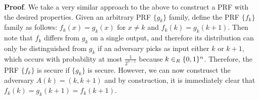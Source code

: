 \documentclass{article}
\begin{document}
\begin{enumerate}
\begin{mdbmarginx}{1ex}{0pt}{1ex}{0pt}%
\noindent{}\textbf{Proof}.    We take a very similar approach to the above to construct a PRF with the desired properties.
  Given an arbitrary PRF $\{g_k \}$ family, define the PRF $\{f_k \}$ family as follows: $f_k(x) = g_k(x)$
  for $x \neq k$ and $f_k(k) = g_k(k+1)$. Then note that $f_k$ differs from $g_k$ on a single 
  output, and therefore its distribution can only be distinguished from $g_k$ if an adversary
  picks as input either $k$ or $k+1$, which occurs with probability at most $\frac{1}{2^{n-1}}$ 
  because $k \in_R \{0,1\}^n$. Therefore, the PRF $\{f_k\}$ is secure if $\{g_k \}$ is secure.
\mdbr
{}  However, we can now construsct the adversary $A(k) = (k, k+1)$ and by construction, it is
  immediately clear that $f_k(k) = g_k(k+1) = f_k(k+1)$.%
\end{mdbmarginx}%
\end{enumerate}%
\end{document}
